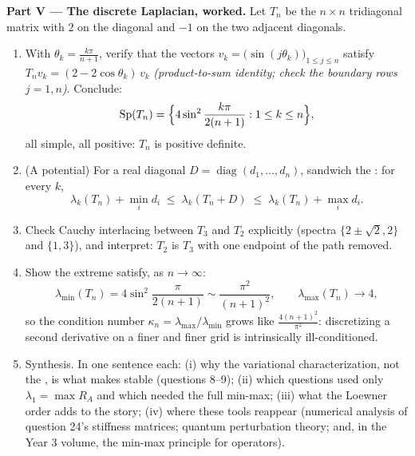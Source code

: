 \begin{problem}
\medskip
\noindent\textbf{Part V --- The discrete Laplacian, worked.}
Let $T_n$ be the $n \times n$ tridiagonal matrix with $2$ on
the diagonal and $-1$ on the two adjacent diagonals.
\begin{enumerate}[resume]
  \item With $\theta_k = \frac{k\pi}{n+1}$, verify that the
        vectors $v_k = \bigl(\sin(j\theta_k)\bigr)_{1\leq j\leq
        n}$ satisfy $T_nv_k = (2 - 2\cos\theta_k)\,v_k$
        \emph{(product-to-sum identity; check the boundary rows
        $j = 1, n$)}. Conclude:
        \[
        \operatorname{Sp}(T_n) = \Bigl\{4\sin^2
        \frac{k\pi}{2(n+1)} : 1 \leq k \leq n\Bigr\},
        \]
        all simple, all positive: $T_n$ is positive definite.
  \item (A potential) For a real diagonal $D =
        \operatorname{diag}(d_1, \dots, d_n)$, sandwich the
        : for every $k$,
        \[
        \lambda_k(T_n) + \min_i d_i \;\leq\;
        \lambda_k(T_n + D) \;\leq\; \lambda_k(T_n) + \max_i
        d_i .
        \]
  \item Check Cauchy interlacing between $T_3$ and $T_2$
        explicitly (spectra $\{2 \pm \sqrt2, 2\}$ and $\{1,
        3\}$), and interpret: $T_2$ is $T_3$ with one endpoint
        of the path removed.
  \item Show the extreme  satisfy, as $n \to
        \infty$:
        \[
        \lambda_{\min}(T_n) = 4\sin^2\frac{\pi}{2(n+1)}
        \sim \frac{\pi^2}{(n+1)^2},
        \qquad
        \lambda_{\max}(T_n) \to 4 ,
        \]
        so the condition number $\kappa_n =
        \lambda_{\max}/\lambda_{\min}$ grows like
        $\frac{4(n+1)^2}{\pi^2}$: discretizing a second
        derivative on a finer and finer grid is
        intrinsically ill-conditioned.
  \item Synthesis. In one sentence each: (i) why the
        variational characterization, not the , is what makes  stable
        (questions 8--9); (ii) which questions used only
        $\lambda_1 = \max R_A$ and which needed the full
        min-max; (iii) what the Loewner order adds to the
        story; (iv) where these tools reappear (numerical
        analysis of question 24's stiffness matrices; quantum
        perturbation theory; and, in the Year 3 volume, the
        min-max principle for  
        operators).
\end{enumerate}
\end{problem}
